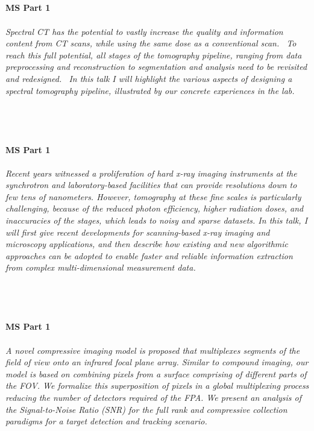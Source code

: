 \begin{multicols}{2}
\\ 
    \\
    \\\\
    \noindent\textbf{MS Part 1}\\
\\  
    \textit{Spectral CT has the potential to vastly increase the quality and information content from CT scans, while using the same dose as a conventional scan.
\
To reach this full potential, all stages of the tomography pipeline, ranging from data preprocessing and reconstruction to segmentation and analysis need to be revisited and redesigned.
\
In this talk I will highlight the various aspects of designing a spectral tomography pipeline, illustrated by our concrete experiences in the lab.}\\
\\ 
    \myaut{Joost Batenburg}\\
    \\\\
    \noindent\textbf{MS Part 1}\\
\\  
    \textit{Recent years witnessed a proliferation of hard x-ray imaging instruments at the synchrotron and laboratory-based facilities that can provide resolutions down to few tens of nanometers. However, tomography at these fine scales is particularly challenging, because of the reduced photon efficiency, higher radiation doses, and inaccuracies of the stages, which leads to noisy and sparse datasets. In this talk, I will first give recent developments for scanning-based x-ray imaging and microscopy applications, and then describe how existing and new algorithmic approaches can be adopted to enable faster and reliable information extraction from complex multi-dimensional measurement data. }\\
\\ 
    \myaut{Doga Gursoy}\\
    \\\\
    \noindent\textbf{MS Part 1}\\
\\  
    \textit{A novel compressive imaging model is proposed that multiplexes segments of the field of view onto an infrared focal plane array.  Similar to compound imaging, our model is based on combining pixels from a surface comprising of different parts of the FOV.  We formalize this superposition of pixels in a global multiplexing process reducing the number of detectors required of the FPA.  We present an analysis of the Signal-to-Noise Ratio (SNR) for the full rank and compressive collection paradigms for a target detection and tracking scenario. }\\

\end{multicols}
